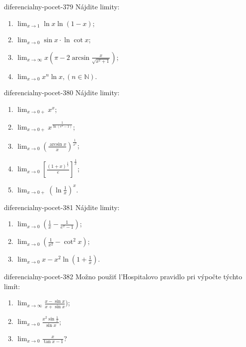 \begin{defproblem}{diferencialny-pocet-379}
Nájdite limity:
\begin{multicols}{2}
\begin{enumerate}
    \item $\lim_{x\rightarrow 1}\ln x \ln (1-x)$;
	\item $\lim_{x\rightarrow 0}\sin x\cdot\ln \cot x$;
	\item $\lim_{x\rightarrow \infty}x(\pi-2\arcsin\frac{x}{\sqrt{x^2+1}})$;
	\item $\lim_{x\rightarrow 0}x^n\ln x,(n\in\mathbb{N})$.
\end{enumerate}
\end{multicols}
\end{defproblem}

\begin{defproblem}{diferencialny-pocet-380}
Nájdite limity:
\begin{multicols}{2}
\begin{enumerate}
    \item $\lim_{x\rightarrow 0+}x^x$;
	\item $\lim_{x\rightarrow 0+}x^{\frac{1}{\ln (e^x-1)}}$;
	\item $\lim_{x\rightarrow 0}(\frac{\arcsin x}{x})^{\frac{1}{x^2}}$;
	\item $\lim_{x\rightarrow 0}[\frac{(1+x)^{\frac{1}{x}}}{e}]^{\frac{1}{x}}$;
	\item $\lim_{x\rightarrow 0+}(\ln \frac{1}{x})^x$.
\end{enumerate}
\end{multicols}
\end{defproblem}

\begin{defproblem}{diferencialny-pocet-381}
Nájdite limity:
\begin{multicols}{2}
\begin{enumerate}
    \item $\lim_{x\rightarrow 0}(\frac{1}{x}-\frac{1}{e^x-1})$;
	\item $\lim_{x\rightarrow 0}(\frac{1}{x^2}-\cot^2 x)$;
	\item $\lim_{x\rightarrow 0}x-x^2\ln (1+\frac{1}{x})$.
\end{enumerate}
\end{multicols}
\end{defproblem}

\begin{defproblem}{diferencialny-pocet-382}
Možno použiť l'Hospitalovo pravidlo pri výpočte týchto limít:
\begin{multicols}{2}
\begin{enumerate}
    \item $\lim_{x\rightarrow \infty}\frac{x-\sin x}{x+\sin x})$;
	\item $\lim_{x\rightarrow 0}\frac{x^2\sin \frac{1}{x}}{\sin x}$;
	\item $\lim_{x\rightarrow 0}\frac{x}{\tan x -1}$?
\end{enumerate}
\end{multicols}
\end{defproblem}

